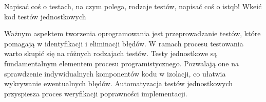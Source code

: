 Napisać coś o  testach, na czym polega, rodzaje testów,
napisać coś o istqb!
Wkeić kod testów jednostkowych

Ważnym aspektem tworzenia oprogramowania jest przeprowadzanie testów, które pomagają w identyfikacji i eliminacji błędów. W ramach procesu testowania warto skupić się na różnych rodzajach testów.
Testy jednostkowe są fundamentalnym elementem procesu programistycznego. Pozwalają one na sprawdzenie indywidualnych komponentów kodu w izolacji, co ułatwia wykrywanie ewentualnych błędów. Automatyzacja testów jednostkowych przyspiesza proces weryfikacji poprawności implementacji.
